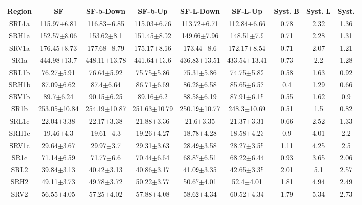 \documentclass[12pt]{paper}
\begin{document}
\begin{table}[ht]\begin{center}\resizebox{\textwidth}{!}
{\begin{tabular}{c|ccccc|c|c|c}
    Region & SF & SF-b-Down & SF-b-Up & SF-L-Down & SF-L-Up & Syst. B & Syst. L & Syst. \\ 
\hline
SRL1a & 115.97$\pm$6.81 & 116.83$\pm$6.85 & 115.03$\pm$6.76 & 113.72$\pm$6.71 & 112.84$\pm$6.66 & 0.78 & 2.32 & 1.36\\ 
SRH1a & 152.57$\pm$8.06 & 153.62$\pm$8.1 & 151.45$\pm$8.02 & 149.66$\pm$7.96 & 148.51$\pm$7.9 & 0.71 & 2.28 & 1.31\\ 
SRV1a & 176.45$\pm$8.73 & 177.68$\pm$8.79 & 175.17$\pm$8.66 & 173.44$\pm$8.6 & 172.17$\pm$8.54 & 0.71 & 2.07 & 1.21\\ 
\hline
SR1a & 444.98$\pm$13.7 & 448.11$\pm$13.78 & 441.64$\pm$13.6 & 436.83$\pm$13.51 & 433.54$\pm$13.41 & 0.73 & 2.2 & 1.28\\ 
\hline
SRL1b & 76.27$\pm$5.91 & 76.64$\pm$5.92 & 75.75$\pm$5.86 & 75.31$\pm$5.86 & 74.75$\pm$5.82 & 0.58 & 1.63 & 0.92\\ 
SRH1b & 87.09$\pm$6.62 & 87.4$\pm$6.64 & 86.71$\pm$6.59 & 86.28$\pm$6.58 & 85.65$\pm$6.53 & 0.4 & 1.29 & 0.66\\ 
SRV1b & 89.7$\pm$6.24 & 90.15$\pm$6.25 & 89.16$\pm$6.2 & 88.58$\pm$6.19 & 87.91$\pm$6.15 & 0.55 & 1.62 & 0.9\\ 
\hline
SR1b & 253.05$\pm$10.84 & 254.19$\pm$10.87 & 251.63$\pm$10.79 & 250.19$\pm$10.77 & 248.3$\pm$10.69 & 0.51 & 1.5 & 0.82\\ 
\hline
SRL1c & 22.04$\pm$3.38 & 22.17$\pm$3.38 & 21.88$\pm$3.36 & 21.6$\pm$3.35 & 21.37$\pm$3.31 & 0.66 & 2.52 & 1.33\\ 
SRH1c & 19.46$\pm$4.3 & 19.61$\pm$4.3 & 19.26$\pm$4.27 & 18.78$\pm$4.28 & 18.58$\pm$4.23 & 0.9 & 4.01 & 2.2\\ 
SRV1c & 29.64$\pm$3.67 & 29.97$\pm$3.7 & 29.31$\pm$3.63 & 28.49$\pm$3.58 & 28.27$\pm$3.55 & 1.11 & 4.25 & 2.5\\ 
\hline
SR1c & 71.14$\pm$6.59 & 71.77$\pm$6.6 & 70.44$\pm$6.54 & 68.87$\pm$6.51 & 68.22$\pm$6.44 & 0.93 & 3.65 & 2.06\\ 
\hline
SRL2 & 39.84$\pm$3.13 & 40.42$\pm$3.13 & 40.86$\pm$3.17 & 41.09$\pm$3.35 & 42.65$\pm$3.35 & 2.01 & 5.1 & 2.57\\ 
SRH2 & 49.11$\pm$3.73 & 49.78$\pm$3.72 & 50.22$\pm$3.77 & 50.67$\pm$4.01 & 52.4$\pm$4.01 & 1.81 & 4.94 & 2.49\\ 
SRV2 & 56.55$\pm$4.05 & 57.25$\pm$4.02 & 57.88$\pm$4.08 & 58.62$\pm$4.34 & 60.52$\pm$4.34 & 1.79 & 5.34 & 2.73\\ 

\end{tabular}}
\end{center}
\end{table}
\end{document}

